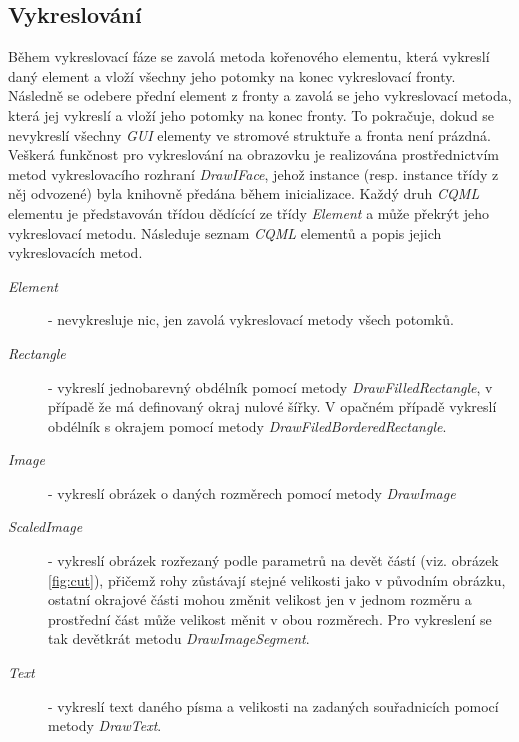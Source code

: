 \documentclass[11pt,twoside,a4paper]{book}
\begin{document}
\subsection{Vykreslování}
Během vykreslovací fáze se zavolá metoda kořenového elementu, která vykreslí daný element a vloží všechny jeho potomky na konec vykreslovací fronty. Následně se odebere přední element z fronty a zavolá se jeho vykreslovací metoda, která jej vykreslí a vloží jeho potomky na konec fronty. To pokračuje, dokud se nevykreslí všechny \textit{GUI} elementy ve stromové struktuře a fronta není prázdná.\\
Veškerá funkčnost pro vykreslování na obrazovku je realizována prostřednictvím metod vykreslovacího rozhraní \textit{DrawIFace}, jehož instance (resp. instance třídy z něj odvozené) byla knihovně předána během inicializace. Každý druh \textit{CQML} elementu je představován třídou dědícící ze třídy \textit{Element} a může překrýt jeho vykreslovací metodu. Následuje seznam \textit{CQML} elementů a popis jejich vykreslovacích metod.\\
\begin{description}
\item [\textit{Element}] - nevykresluje nic, jen zavolá vykreslovací metody všech potomků.
\item [\textit{Rectangle}] - vykreslí jednobarevný obdélník pomocí metody \textit{DrawFilledRectangle}, v případě že má definovaný okraj nulové šířky. V opačném případě vykreslí obdélník s okrajem pomocí metody \textit{DrawFiledBorderedRectangle}.
\item [\textit{Image}] - vykreslí obrázek o daných rozměrech pomocí metody \textit{DrawImage}
\item [\textit{ScaledImage}] - vykreslí obrázek rozřezaný podle parametrů na devět částí (viz. obrázek \ref{fig:cut}), přičemž rohy zůstávají stejné velikosti jako v původním obrázku, ostatní okrajové části mohou změnit velikost jen v jednom rozměru a prostřední část může velikost měnit v obou rozměrech. Pro vykreslení se tak devětkrát metodu \textit{DrawImageSegment}.
\item [\textit{Text}] - vykreslí text daného písma a velikosti na zadaných souřadnicích pomocí metody \textit{DrawText}.
\end{description}
\end{document}
